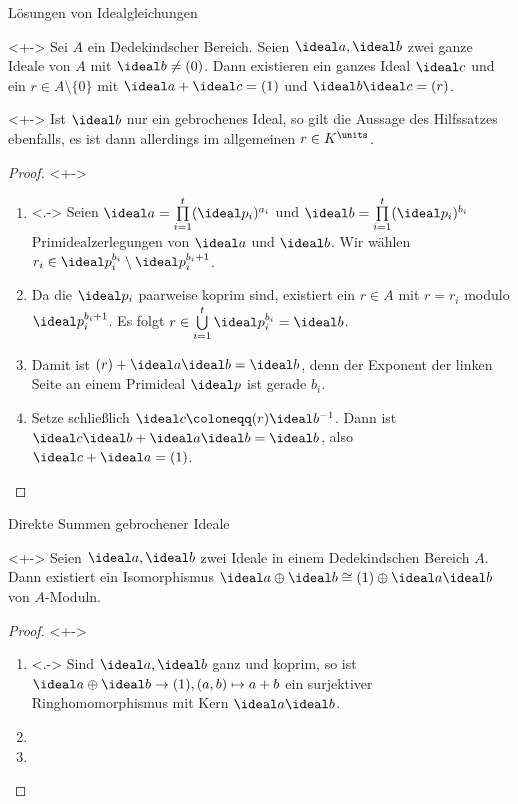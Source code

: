 \begin{frame}{Lösungen von Idealgleichungen}
	\begin{lemma}<+->
		Sei \(A\) ein Dedekindscher Bereich. Seien \(\ideal a, \ideal b\) zwei ganze Ideale von \(A\) mit
		\(\ideal b \neq (0)\).
		Dann existieren ein ganzes Ideal \(\ideal c\) und ein \(r \in A \setminus \{0\}\)
		mit \(\ideal a + \ideal c = (1)\) und \(\ideal b \ideal c = (r)\).
	\end{lemma}
	\begin{visibleenv}<+->
		Ist \(\ideal b\) nur ein gebrochenes Ideal, so gilt die Aussage des Hilfssatzes ebenfalls, es ist dann
		allerdings im allgemeinen \(r \in K^\units\).
	\end{visibleenv}
	\begin{proof}<+->
		\begin{enumerate}[<+->]
		\item<.->
			Seien \(\ideal a = \prod\limits_{i = 1}^t (\ideal p_i)^{a_i}\)
			und \(\ideal b = \prod\limits_{i = 1}^t (\ideal p_i)^{b_i}\)
			Primidealzerlegungen von \(\ideal a\) und \(\ideal b\).
			Wir wählen \(r_i \in \ideal p_i^{b_i} \setminus \ideal p_i^{b_i + 1}\).
		\item
			Da die \(\ideal p_i\) paarweise koprim sind, existiert ein \(r \in A\) mit \(r = r_i\)
			modulo \(\ideal p_i^{b_i + 1}\). Es folgt \(r \in \bigcup\limits_{i = 1}^t
			\ideal p_i^{b_i} = \ideal b\).
		\item
			Damit ist \((r) + \ideal a \ideal b = \ideal b\), denn der Exponent der linken Seite an einem Primideal
			\(\ideal p\) ist gerade \(b_i\).
		\item
			Setze schließlich \(\ideal c \coloneqq (r) \ideal b^{-1}\). Dann ist \(\ideal c \ideal b + \ideal a \ideal b
			= \ideal b\), also \(\ideal c + \ideal a = (1)\).
			\qedhere
		\end{enumerate}
	\end{proof}
\end{frame}

\begin{frame}{Direkte Summen gebrochener Ideale}
	\begin{lemma}<+->
		Seien \(\ideal a, \ideal b\) zwei Ideale in einem Dedekindschen Bereich \(A\). Dann existiert
		ein Isomorphismus \(\ideal a \oplus \ideal b \cong (1) \oplus \ideal a \ideal b\) von \(A\)-Moduln.
	\end{lemma}
	\begin{proof}<+->
		\begin{enumerate}[<+->]
		\item<.->
			Sind \(\ideal a, \ideal b\) ganz und koprim, so ist \(\ideal a \oplus \ideal b \to (1), (a, b) \mapsto
			a + b\) ein surjektiver Ringhomomorphismus mit Kern \(\ideal a \ideal b\).
		\item
		\item
		\end{enumerate}
	\end{proof}
\end{frame}

